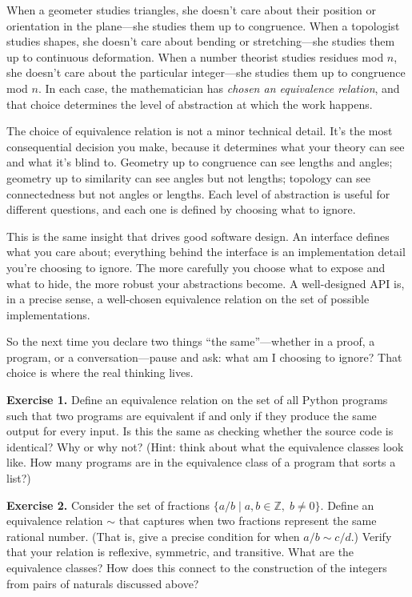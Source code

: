 \documentclass[11pt]{article}
\begin{document}
When a geometer studies triangles, she doesn't care about their position or orientation in the plane---she studies them up to congruence. When a topologist studies shapes, she doesn't care about bending or stretching---she studies them up to continuous deformation. When a number theorist studies residues mod $n$, she doesn't care about the particular integer---she studies them up to congruence mod $n$. In each case, the mathematician has \emph{chosen an equivalence relation}, and that choice determines the level of abstraction at which the work happens.

The choice of equivalence relation is not a minor technical detail. It's the most consequential decision you make, because it determines what your theory can see and what it's blind to. Geometry up to congruence can see lengths and angles; geometry up to similarity can see angles but not lengths; topology can see connectedness but not angles or lengths. Each level of abstraction is useful for different questions, and each one is defined by choosing what to ignore.

This is the same insight that drives good software design. An interface defines what you care about; everything behind the interface is an implementation detail you're choosing to ignore. The more carefully you choose what to expose and what to hide, the more robust your abstractions become. A well-designed API is, in a precise sense, a well-chosen equivalence relation on the set of possible implementations.

So the next time you declare two things ``the same''---whether in a proof, a program, or a conversation---pause and ask: what am I choosing to ignore? That choice is where the real thinking lives.

\bigskip
\textbf{Exercise 1.}\label{ex:equiv:1} Define an equivalence relation on the set of all Python programs such that two programs are equivalent if and only if they produce the same output for every input. Is this the same as checking whether the source code is identical? Why or why not? (Hint: think about what the equivalence classes look like. How many programs are in the equivalence class of a program that sorts a list?)

\bigskip
\textbf{Exercise 2.}\label{ex:equiv:2} Consider the set of fractions $\{a/b \mid a, b \in \mathbb{Z},\; b \neq 0\}$. Define an equivalence relation $\sim$ that captures when two fractions represent the same rational number. (That is, give a precise condition for when $a/b \sim c/d$.) Verify that your relation is reflexive, symmetric, and transitive. What are the equivalence classes? How does this connect to the construction of the integers from pairs of naturals discussed above?
\end{document}
